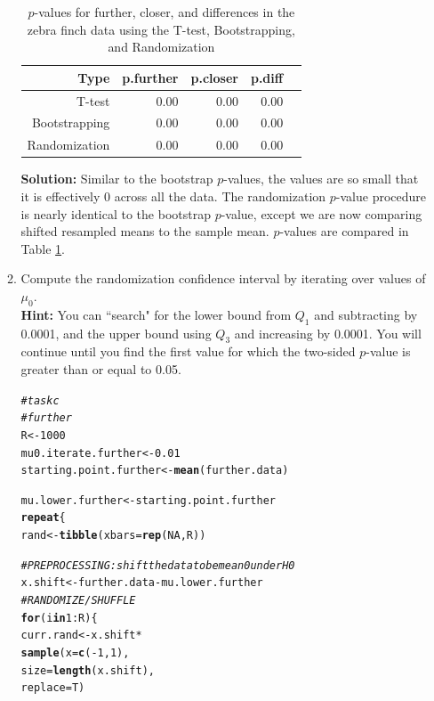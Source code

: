 \documentclass{article}\usepackage[]{graphicx}\usepackage[]{xcolor}
\makeatletter
\newcommand{\hlnum}[1]{\textcolor[rgb]{0.686,0.059,0.569}{#1}}%
\newcommand{\hlcom}[1]{\textcolor[rgb]{0.678,0.584,0.686}{\textit{#1}}}%
\newcommand{\hlopt}[1]{\textcolor[rgb]{0,0,0}{#1}}%
\newcommand{\hldef}[1]{\textcolor[rgb]{0.345,0.345,0.345}{#1}}%
\newcommand{\hlkwa}[1]{\textcolor[rgb]{0.161,0.373,0.58}{\textbf{#1}}}%
\newcommand{\hlkwb}[1]{\textcolor[rgb]{0.69,0.353,0.396}{#1}}%
\newcommand{\hlkwc}[1]{\textcolor[rgb]{0.333,0.667,0.333}{#1}}%
\newcommand{\hlkwd}[1]{\textcolor[rgb]{0.737,0.353,0.396}{\textbf{#1}}}%
\newenvironment{kframe}{%
 \def\at@end@of@kframe{}%
 \ifinner\ifhmode%
  \def\at@end@of@kframe{\end{minipage}}%
  \begin{minipage}{\columnwidth}%
 \fi\fi%
 \def\FrameCommand##1{\hskip\@totalleftmargin \hskip-\fboxsep
 \colorbox{shadecolor}{##1}\hskip-\fboxsep
     \hskip-\linewidth \hskip-\@totalleftmargin \hskip\columnwidth}%
 \MakeFramed {\advance\hsize-\width
   \@totalleftmargin\z@ \linewidth\hsize
   \@setminipage}}%
 {\par\unskip\endMakeFramed%
 \at@end@of@kframe}
\newenvironment{knitrout}{}{} %
\makeatother
\begin{document}
\begin{enumerate}
\begin{enumerate}
\begin{table}[ht]
\centering
\begin{tabular}{rrrrr}
  \hline
 Type & p.further & p.closer & p.diff \\ 
  \hline
T-test & 0.00 & 0.00 & 0.00 \\ 
  Bootstrapping & 0.00 & 0.00 & 0.00 \\
  Randomization & 0.00 & 0.00 & 0.00 \\
   \hline
\end{tabular}
\caption{$p$-values for further, closer, and differences in the zebra finch data using the T-test, Bootstrapping, and Randomization}
\label{table3}
\end{table}
  \textbf{Solution:} Similar to the bootstrap $p$-values, the values are so small that it is effectively $0$ across all the data. The randomization $p$-value procedure is nearly identical to the bootstrap $p$-value, except we are now comparing shifted resampled means to the sample mean. $p$-values are compared in Table \ref{table3}.
  
  \item Compute the randomization confidence interval by iterating over values of $\mu_0$.\\
  \textbf{Hint:} You can ``search" for the lower bound from $Q_1$ and subtracting by 0.0001, 
  and the upper bound using $Q_3$ and increasing by 0.0001. You will continue until you find 
  the first value for which the two-sided $p$-value is greater than or equal to 0.05. \\
\begin{knitrout}
\color{fgcolor}\begin{kframe}
\begin{alltt}
\hlcom{# task c}
\hlcom{# further }
\hldef{R} \hlkwb{<-} \hlnum{1000}
\hldef{mu0.iterate.further} \hlkwb{<-} \hlnum{0.01}
\hldef{starting.point.further} \hlkwb{<-} \hlkwd{mean}\hldef{(further.data)}

\hldef{mu.lower.further} \hlkwb{<-} \hldef{starting.point.further}
\hlkwa{repeat}\hldef{\{}
\hldef{rand} \hlkwb{<-} \hlkwd{tibble}\hldef{(}\hlkwc{xbars} \hldef{=} \hlkwd{rep}\hldef{(}\hlnum{NA}\hldef{, R))}

\hlcom{# PREPROCESSING: shift the data to be mean 0 under H0}
\hldef{x.shift} \hlkwb{<-} \hldef{further.data} \hlopt{-} \hldef{mu.lower.further}
\hlcom{# RANDOMIZE / SHUFFLE}
\hlkwa{for}\hldef{(i} \hlkwa{in} \hlnum{1}\hlopt{:}\hldef{R)\{}
  \hldef{curr.rand} \hlkwb{<-} \hldef{x.shift} \hlopt{*}
    \hlkwd{sample}\hldef{(}\hlkwc{x} \hldef{=} \hlkwd{c}\hldef{(}\hlopt{-}\hlnum{1}\hldef{,} \hlnum{1}\hldef{),}
           \hlkwc{size} \hldef{=} \hlkwd{length}\hldef{(x.shift),}
           \hlkwc{replace} \hldef{= T)}


\end{alltt}
\end{kframe}
\end{knitrout}
\end{enumerate}
\end{enumerate}
\end{document}

